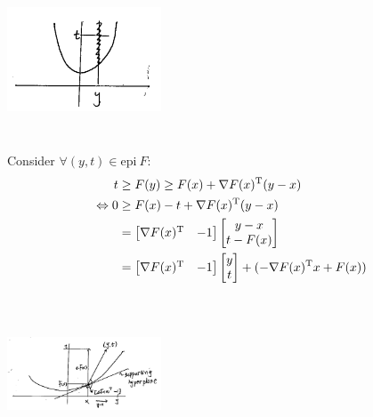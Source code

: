 \begin{marginfigure}
	\centering
	\includegraphics[width=1.8in,height=1.8in]{figures/ch08/figure1106_2.png}
\end{marginfigure}

Consider $\forall (y,t)\in \text{epi}\ F$:
\begin{align*}
t 
&\geq F(y) \geq F(x) + \nabla F(x)^{{\rm T}}(y-x)\\
\Leftrightarrow 0 &\geq F(x) - t + \nabla F(x)^{{\rm T}}(y-x)\\
&= 
\begin{bmatrix}
\nabla F(x)^{{\rm T}} & -1
\end{bmatrix}
\begin{bmatrix}
y-x\\
t -F(x)
\end{bmatrix}\\
&= 
\begin{bmatrix}
\nabla F(x)^{{\rm T}}  & -1
\end{bmatrix}
\begin{bmatrix}
y\\
t
\end{bmatrix} + (-\nabla F(x)^{{\rm T}}x + F(x))
\end{align*}

\begin{marginfigure}
	\centering
	\includegraphics[width=1.8in,height=1.8in]{figures/ch08/figure1106_3.png}
\end{marginfigure}


